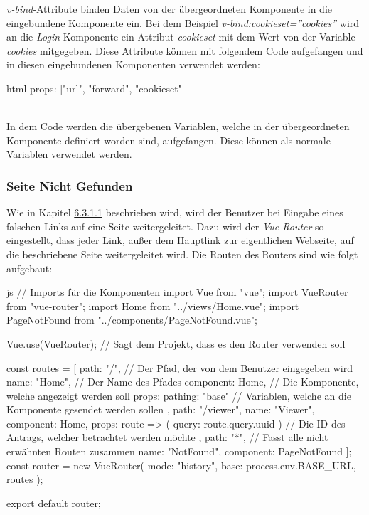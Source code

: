 \textit{v-bind}-Attribute binden Daten von der übergeordneten Komponente in die eingebundene Komponente ein. Bei dem Beispiel \textit{v-bind:cookieset=''cookies''} wird an die \textit{Login}-Komponente ein Attribut \textit{cookieset} mit dem Wert von der Variable \textit{cookies} mitgegeben.
Diese Attribute können mit folgendem Code aufgefangen und in diesen eingebundenen Komponenten verwendet werden:
\begin{code}{html}
		props: ["url", "forward", "cookieset"]
\end{code}
~\\
In dem Code werden die übergebenen Variablen, welche in der übergeordneten Komponente definiert worden sind, aufgefangen. Diese können als normale Variablen verwendet werden.
\newpage
\subsubsection{Seite Nicht Gefunden}
Wie in Kapitel \hyperref[sec:not_found]{6.3.1.1} beschrieben wird, wird der Benutzer bei Eingabe eines falschen Links auf eine Seite weitergeleitet. Dazu wird der \textit{Vue-Router} so eingestellt, dass jeder Link, außer dem Hauptlink zur eigentlichen Webseite, auf die beschriebene Seite weitergeleitet wird. Die Routen des Routers sind wie folgt aufgebaut:
\begin{code}{js}
// Imports für die Komponenten
import Vue from "vue";
import VueRouter from "vue-router";
import Home from "../views/Home.vue";
import PageNotFound from "../components/PageNotFound.vue";

Vue.use(VueRouter);		// Sagt dem Projekt, dass es den Router verwenden soll

const routes = [
{
	path: "/",					// Der Pfad, der von dem Benutzer eingegeben wird
	name: "Home",				// Der Name des Pfades
	component: Home,			// Die Komponente, welche angezeigt werden soll
	props: { pathing: "base" }	// Variablen, welche an die Komponente gesendet werden sollen
},
{
	path: "/viewer",
	name: "Viewer",
	component: Home,
	props: route => ({ query: route.query.uuid })	// Die ID des Antrags, welcher betrachtet werden möchte
},
{
	path: "*",				// Fasst alle nicht erwähnten Routen zusammen
	name: "NotFound",
	component: PageNotFound
}
];
const router = new VueRouter({
	mode: "history",
	base: process.env.BASE_URL,
	routes
});

export default router;
\end{code}
~\\

